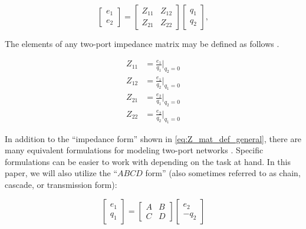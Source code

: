 \documentclass[lettersize,journal]{IEEEtran}
\begin{document}
\begin{equation} \label{eq:Z_mat_def_general}
        \begin{bmatrix} e_1 \\ e_2 \end{bmatrix} = \begin{bmatrix} Z_{11} & Z_{12} \\ Z_{21} & Z_{22} \end{bmatrix} \begin{bmatrix} q_1 \\ q_2 \end{bmatrix},
\end{equation}

\noindent{}The elements of any two-port impedance matrix may be defined as follows \cite{Frickey:1994aa}.

\begin{subequations} \label{eq:Z_mat_elements_def}
        \begin{align}
                Z_{11}& = \frac{e_1}{q_1} \bigg \vert_{q_2=0} \label{eq:Z_mat_elements_def_Z11} \\[1em]
                Z_{12}& = \frac{e_1}{q_2} \bigg \vert_{q_1=0} \label{eq:Z_mat_elements_def_Z12} \\[1em]
                Z_{21}& = \frac{e_2}{q_1} \bigg \vert_{q_2=0} \label{eq:Z_mat_elements_def_Z21} \\[1em]
                Z_{22}& = \frac{e_2}{q_2} \bigg \vert_{q_1=0} \label{eq:Z_mat_elements_def_Z22}
        \end{align}
\end{subequations}

In addition to the ``impedance form'' shown in \eqref{eq:Z_mat_def_general}, there are many equivalent formulations for modeling two-port networks \cite{Frickey:1994aa}.
Specific formulations can be easier to work with depending on the task at hand.
In this paper, we will also utilize the ``$ABCD$ form'' (also sometimes referred to as chain, cascade, or transmission form):

\begin{equation}
        \label{eq:abcd_mat_def_general}
        \begin{bmatrix} e_1 \\ q_1 \end{bmatrix}
        = 
        \begin{bmatrix} A & B \\ C & D \end{bmatrix}
        \begin{bmatrix} e_2 \\ - q_2 \end{bmatrix}
\end{equation}
\end{document}
